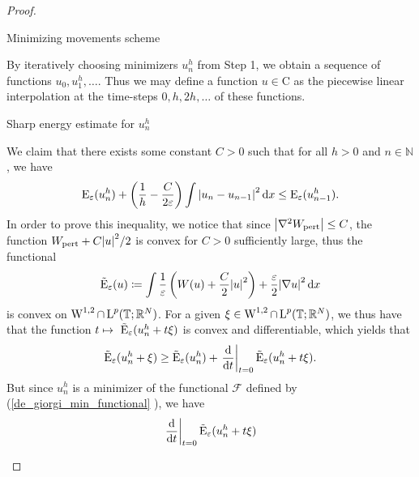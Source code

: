 \begin{proof}
\begin{description}[wide=0pt]
	\item[Step 2:] Minimizing movements scheme 
	
	By iteratively choosing minimizers $ u_{ n }^{ h } $ from Step 1, we obtain a sequence of functions $ u_{ 0 }, u_{ 1 }^{ h } , \dotsc $. Thus we may define a function $ u \in \mathrm{ C } $ as the piecewise linear interpolation at the time-steps $ 0, h , 2h, \dotsc $ of these functions.
	
	\item[Step 3:] Sharp energy estimate for $ u_{ n }^{ h } $
	
	We claim that there exists some constant $ C > 0 $ such that for all $ h > 0 $ and $ n \in \mathbb{ N } $, we have
	\begin{equation}
		\label{discrete_optimal_energy_dissipation}
		\operatorname{E}_{ \varepsilon } ( u_{ n }^{ h } )
		+
		\left( \frac{ 1 }{ h } - \frac{ C }{ 2 \varepsilon } \right)
		\int \abs{ u_{ n } - u_{ n - 1 } }^{ 2 } \dd{ x }
		\leq
		\operatorname{E}_{ \varepsilon } ( u_{ n - 1 }^{ h } ).
	\end{equation}
	In order to prove this inequality, we notice that since $ \abs{ \nabla^{ 2 } W_{ \mathrm{pert} } } \leq C $, the function $ W_{ \mathrm{pert} } + C \abs{ u }^{ 2 }/2 $ is convex for $ C > 0 $ sufficiently large, thus the functional 
	\begin{equation*}
		\tilde{\operatorname{E}}_{ \varepsilon }  ( u )
		\coloneqq
		\int 
			\frac{ 1 }{ \varepsilon }
			\left( W ( u ) + \frac{ C }{ 2 } \abs{ u }^{ 2 } \right)
			+
			\frac{ \varepsilon}{ 2 }
			\abs{ \nabla u }^{ 2 }
		\dd{ x }
	\end{equation*}
	is convex on $ \operatorname{W}^{ 1 , 2 } \cap \operatorname{L}^{ p } ( \operatorname{\mathbb{T}} ; \mathbb{ R }^{ N } ) $. For a given $ \xi \in \operatorname{W}^{ 1 , 2 } \cap \operatorname{L}^{ p } ( \operatorname{\mathbb{T}} ; \mathbb{ R }^{ N } ) $, we thus have that the function
	$ t \mapsto \ \tilde{\operatorname{E}}_{ \varepsilon } ( u_{ n }^{ h } + t \xi ) $ is convex and differentiable, which yields that
	\begin{equation}
		\label{convexity_at_time_1}
		\tilde{\operatorname{E}}_{ \varepsilon } ( u_{ n }^{ h } + \xi )
		\geq
		\tilde{\operatorname{E}}_{ \varepsilon } ( u_{ n }^{ h } ) + 
		\left.\dv{ t }\right|_{ t = 0 } \tilde{\operatorname{E}}_{ \varepsilon } ( u_{ n }^{ h } + t \xi).
	\end{equation} 
	But since $ u_{ n }^{ h } $ is a minimizer of the functional $\mathcal{ F }$ defined by (\ref{de_giorgi_min_functional} ), we have
	\begin{align*}
		\left. \dv{ t } \right|_{ t= 0 }
			\tilde{\energy}_{ \varepsilon} ( u_{ n }^{ h } + t \xi )

\end{align*}
\end{description}
\end{proof}

